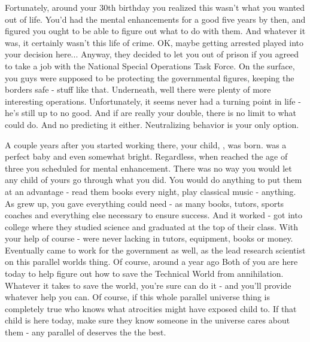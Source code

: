 \documentclass[char]{guildcamp3}
\begin{document}
Fortunately, around your 30th birthday you realized this wasn't what you wanted out of life. You'd had the mental enhancements for a good five years by then, and figured you ought to be able to figure out what to do with them. And whatever it was, it certainly wasn't this life of crime. OK, maybe getting arrested played into your decision here... Anyway, they decided to let you out of prison if you agreed to take a job with the National Special Operations Task Force. On the surface, you guys were supposed to be protecting the governmental figures, keeping the borders safe - stuff like that. Underneath, well there were plenty of more interesting operations. Unfortunately, it seems \cRogueTwo{\formal} never had a turning point in \cRogueTwo{\their} life - he's still up to no good. And if  are really your double, there is no limit to what \cRogueTwo{\they} could do. And no predicting it either. Neutralizing \cRogueTwo{\their} behavior is your only option. 

A couple years after you started working there, your child, \cSciOne{\intro}, was born. \cSciOne{\they} was a perfect baby and even somewhat bright. Regardless, when \cSciOne{\they} reached the age of three you scheduled \cSciOne{\them} for mental enhancement. There was no way you would let any child of yours go through what you did. You would do anything to put them at an advantage - read them books every night, play classical music - anything. As \cSciOne{\informal} grew up, you gave \cSciOne{\them} everything \cSciOne{\they} could need - as many books, tutors, sports coaches and everything else necessary to ensure success. And it worked - \cSciOne{\informal} got into college where they studied science and graduated at the top of their class. With your help of course - \cSciOne{\they} were never lacking in tutors, equipment, books or money. Eventually \cSciOne{} came to work for the government as well, as the lead research scientist on this parallel worlds thing. Of course, around a year ago Both of you are here today to help figure out how to save the Technical World from annihilation. Whatever it takes to save the world, you're sure \cSciOne{\informal} can do it - and you'll provide whatever help you can. Of course, if this whole parallel universe thing is completely true who knows what atrocities \cRogueTwo{} might have exposed  child to. If that child is here today, make sure they know someone in the universe cares about them - any parallel of \cSciOne{\informal} deserves the the best. 
\end{document}
